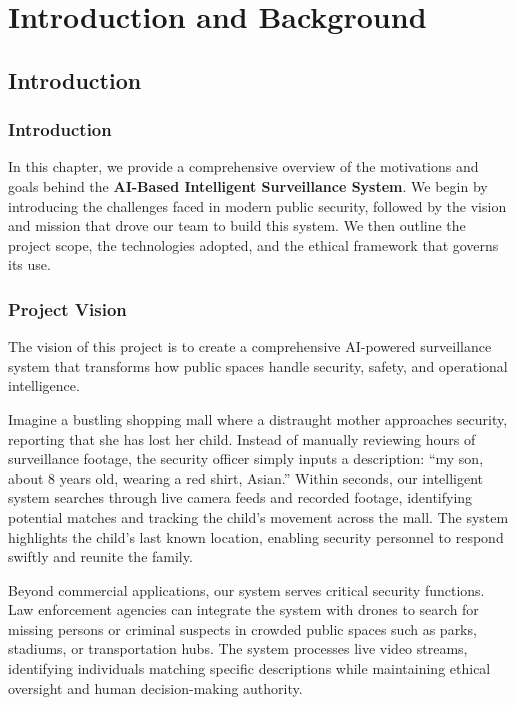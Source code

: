 \documentclass[12pt]{report}
\begin{document}
\newpage

\part{Introduction and Background}

\setcounter{chapter}{0}
\chapter{Introduction}
\setcounter{section}{0}

\section{Introduction}
In this chapter, we provide a comprehensive overview of the motivations and goals behind the \textbf{AI-Based Intelligent Surveillance System}. We begin by introducing the challenges faced in modern public security, followed by the vision and mission that drove our team to build this system. We then outline the project scope, the technologies adopted, and the ethical framework that governs its use.

\section{Project Vision}
The vision of this project is to create a comprehensive AI-powered surveillance system that transforms how public spaces handle security, safety, and operational intelligence.

Imagine a bustling shopping mall where a distraught mother approaches security, reporting that she has lost her child. Instead of manually reviewing hours of surveillance footage, the security officer simply inputs a description: ``my son, about 8 years old, wearing a red shirt, Asian.'' Within seconds, our intelligent system searches through live camera feeds and recorded footage, identifying potential matches and tracking the child's movement across the mall. The system highlights the child's last known location, enabling security personnel to respond swiftly and reunite the family.

\vspace{0.5em}
\noindent Beyond commercial applications, our system serves critical security functions. Law enforcement agencies can integrate the system with drones to search for missing persons or criminal suspects in crowded public spaces such as parks, stadiums, or transportation hubs. The system processes live video streams, identifying individuals matching specific descriptions while maintaining ethical oversight and human decision-making authority.
\end{document}
